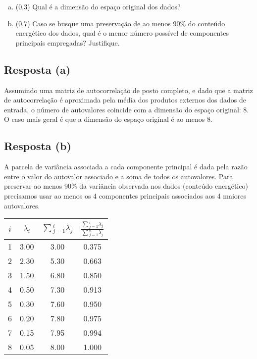 \documentclass[final,3p]{elsarticle}
\numberwithin{equation}{section}
\begin{document}
    \begin{enumerate}[(a)]
        \item (0,3) Qual é a dimensão do espaço original dos dados?
        \item (0,7) Caso se busque uma preservação de ao menos 90\% do conteúdo energético dos dados, qual é o menor número possível de componentes principais empregadas? Justifique.
    \end{enumerate}

    \subsection{Resposta \textbf{(a)}}

        Assumindo uma matriz de autocorrelação de posto completo, e dado que a matriz de autocorrelação é aproximada pela média dos produtos externos dos dados de entrada, o número de autovalores coincide com a dimensão do espaço original: 8. O caso mais geral é que a dimensão do espaço original é ao menos 8.

    \subsection{Resposta \textbf{(b)}}

        A parcela de variância associada a cada componente principal é dada pela razão entre o valor do autovalor associado e a soma de todos os autovalores. Para preservar ao menos 90\% da variância observada nos dados (conteúdo energético) precisamos usar ao menos os 4 componentes principais associados aos 4 maiores autovalores.

        \begin{table}[H]
            \centering
            \begin{tabular}{c c c c}
                \toprule
                \textbf{$i$} & \textbf{$\lambda{}_i$} & \textbf{$\sum{}_{j=1}^i\lambda{}_j$} & \textbf{$\frac{\sum{}_{j=1}^i\lambda{}_j}{\sum{}_{j=1}^n\lambda{}_j}$} \\
                \midrule
                1 & 3.00 & 3.00 & 0.375 \\
                2 & 2.30 & 5.30 & 0.663 \\
                3 & 1.50 & 6.80 & 0.850 \\
                4 & 0.50 & 7.30 & 0.913 \\
                5 & 0.30 & 7.60 & 0.950 \\
                6 & 0.20 & 7.80 & 0.975 \\
                7 & 0.15 & 7.95 & 0.994 \\
                8 & 0.05 & 8.00 & 1.000 \\
                \bottomrule
            \end{tabular}
        \end{table}
\end{document}
